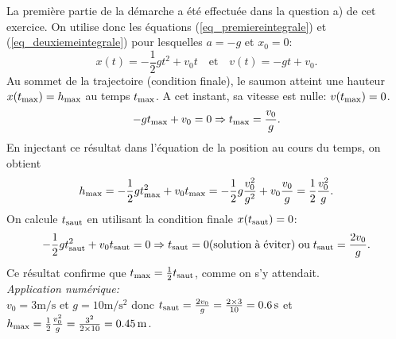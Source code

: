 \begin{enumerate}
\begin{itemize}
La premi\`ere partie de la d\'emarche a \'et\'e effectu\'ee dans la question a) de cet exercice. On utilise donc les \'equations (\eqref{eq_premiereintegrale}) et (\eqref{eq_deuxiemeintegrale}) pour lesquelles $a=-g$ et $x_0=0$:
\[
x(t) = -\frac{1}{2}gt^2 + v_0 t \quad \textrm{et} \quad v(t) = -gt + v_0. 
\]
Au sommet de la trajectoire (condition finale), le saumon atteint une hauteur $x(t_{\rm max}) = h_{\rm max}$ au temps $t_{\rm max}$. A cet instant, sa vitesse est nulle: $v(t_{\rm max})=0$. 
\[
-gt_{\rm max} + v_0=0 \Rightarrow t_{\rm max} = \frac{v_0}{g}.
\]
En injectant ce r\'esultat dans l'\'equation de la position au cours du temps, on obtient 
\[
h_{\rm max} = -\frac{1}{2}gt_{\rm max}^2 +v_0 t_{\rm max} = -\frac{1}{2}g\frac{v^2_0}{g^2} +v_0 \frac{v_0}{g} = \frac{1}{2}\frac{v_0^2}{g}.
\]
On calcule $t_{\rm saut}$ en utilisant la condition finale $x(t_{\rm saut}) = 0$:
\[
-\frac{1}{2}gt_{\rm saut}^2 + v_0t_{\rm saut}=0 \Rightarrow t_{\rm saut}=0 \mathrm{(solution\; \grave{a}\;\acute{e}viter)\;ou}\;t_{\rm saut} = \frac{2v_0}{g}.
\]
Ce r\'esultat confirme que $t_{\rm max} = \frac{1}{2}t_{\rm saut}$, comme on s'y attendait. \\

\emph{Application numérique:} \\
$v_0=3 \text{m/s}$ et $g=10 \text{m/s$^{2}$}$ donc $t_{\rm saut} = \frac{2v_0}{g} = \frac{2\times 3}{10}=0.6\,{\rm s}$ et $h_{\rm max} = \frac{1}{2}\frac{v_0^2}{g} = \frac{3^2}{2\times10}=0.45\,{\rm m}$. \\


\end{itemize}
\end{enumerate}
